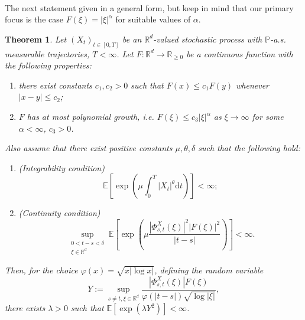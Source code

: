 \documentclass[10pt]{article}
\newcommand{\assign}{:=}
\newcommand{\mathd}{\mathrm{d}}
\newtheorem{theorem}{Theorem}%
\begin{document}
\

The next statement given in a general form, but keep in mind that our primary
focus is the case $F (\xi) = | \xi |^{\alpha}$ for suitable values of
$\alpha$.

\begin{theorem}
  \label{sec4.1 thm general criterion}Let $(X_t)_{t \in [0, T]}$ be an
  $\mathbb{R}^d$\mbox{-}valued stochastic process with $\mathbb{P}$-a.s.
  measurable trajectories, $T < \infty$. Let $F : \mathbb{R}^d \rightarrow
  \mathbb{R}_{\geqslant 0}$ be a continuous function with the following
  properties:
  \begin{enumerate}[label=\roman*.]
    \item there exist constants $c_1, c_2 > 0$ such that $F (x) \leqslant c_1
    F (y)$ whenever $| x - y | \leqslant c_2$;
    
    \item $F$ has at most polynomial growth, i.e. $F (\xi) \leqslant c_3 | \xi
    |^{\alpha}$ as $\xi \rightarrow \infty$ for some $\alpha < \infty$, $c_3 >
    0$.
  \end{enumerate}
  Also assume that there exist positive constants $\mu, \theta, \delta$ such
  that the following hold:
  \begin{enumerate}
    \item (Integrability condition)
    \begin{equation}
      \mathbb{E} \left[ \exp \left( \mu \int_0^T | X_t |^{\theta} \mathd t
      \right) \right] < \infty \label{sec4.1 general criterion integrability}
      ;
    \end{equation}
    \item (Continuity condition)
    \begin{equation}
      \sup_{\substack{        0 < t - s < \delta\\
        \xi \in \mathbb{R}^d }}
        \mathbb{E} \left[ \exp \left( \mu \frac{| \Phi^X_{s, t}
      (\xi) |^2  | F (\xi) |^2}{| t - s |} \right) \right] < \infty
      \label{sec4.1 general criterion continuity} .
    \end{equation}
  \end{enumerate}
  Then, for the choice $\varphi (x) = \sqrt{x | \log x |}$, defining the
  random variable
  \[ Y \assign \sup_{s \neq t, \xi \in \mathbb{R}^d} \frac{| \Phi^X_{s, t}
     (\xi) | F (\xi)}{\varphi (| t - s |) \sqrt{\log | \xi |}}, \]
  there exists $\lambda > 0$ such that $\mathbb{E} [\exp (\lambda Y^2)] <
  \infty$.
\end{theorem}
\end{document}
